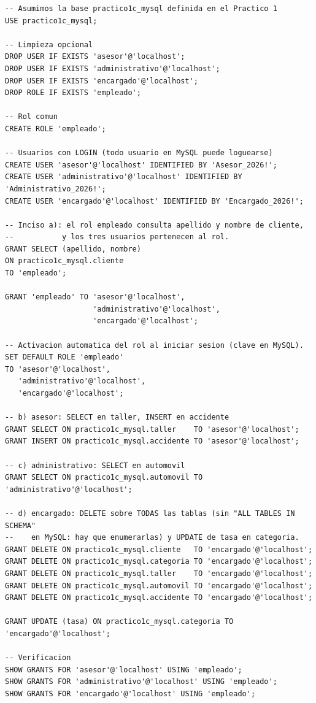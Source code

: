 \documentclass[11pt,a4paper]{article}
\begin{document}
\begin{lstlisting}
-- Asumimos la base practico1c_mysql definida en el Practico 1
USE practico1c_mysql;

-- Limpieza opcional
DROP USER IF EXISTS 'asesor'@'localhost';
DROP USER IF EXISTS 'administrativo'@'localhost';
DROP USER IF EXISTS 'encargado'@'localhost';
DROP ROLE IF EXISTS 'empleado';

-- Rol comun
CREATE ROLE 'empleado';

-- Usuarios con LOGIN (todo usuario en MySQL puede loguearse)
CREATE USER 'asesor'@'localhost' IDENTIFIED BY 'Asesor_2026!';
CREATE USER 'administrativo'@'localhost' IDENTIFIED BY 'Administrativo_2026!';
CREATE USER 'encargado'@'localhost' IDENTIFIED BY 'Encargado_2026!';

-- Inciso a): el rol empleado consulta apellido y nombre de cliente,
--           y los tres usuarios pertenecen al rol.
GRANT SELECT (apellido, nombre)
ON practico1c_mysql.cliente
TO 'empleado';

GRANT 'empleado' TO 'asesor'@'localhost',
                    'administrativo'@'localhost',
                    'encargado'@'localhost';

-- Activacion automatica del rol al iniciar sesion (clave en MySQL).
SET DEFAULT ROLE 'empleado'
TO 'asesor'@'localhost',
   'administrativo'@'localhost',
   'encargado'@'localhost';

-- b) asesor: SELECT en taller, INSERT en accidente
GRANT SELECT ON practico1c_mysql.taller    TO 'asesor'@'localhost';
GRANT INSERT ON practico1c_mysql.accidente TO 'asesor'@'localhost';

-- c) administrativo: SELECT en automovil
GRANT SELECT ON practico1c_mysql.automovil TO 'administrativo'@'localhost';

-- d) encargado: DELETE sobre TODAS las tablas (sin "ALL TABLES IN SCHEMA"
--    en MySQL: hay que enumerarlas) y UPDATE de tasa en categoria.
GRANT DELETE ON practico1c_mysql.cliente   TO 'encargado'@'localhost';
GRANT DELETE ON practico1c_mysql.categoria TO 'encargado'@'localhost';
GRANT DELETE ON practico1c_mysql.taller    TO 'encargado'@'localhost';
GRANT DELETE ON practico1c_mysql.automovil TO 'encargado'@'localhost';
GRANT DELETE ON practico1c_mysql.accidente TO 'encargado'@'localhost';

GRANT UPDATE (tasa) ON practico1c_mysql.categoria TO 'encargado'@'localhost';

-- Verificacion
SHOW GRANTS FOR 'asesor'@'localhost' USING 'empleado';
SHOW GRANTS FOR 'administrativo'@'localhost' USING 'empleado';
SHOW GRANTS FOR 'encargado'@'localhost' USING 'empleado';
\end{lstlisting}
\end{document}
